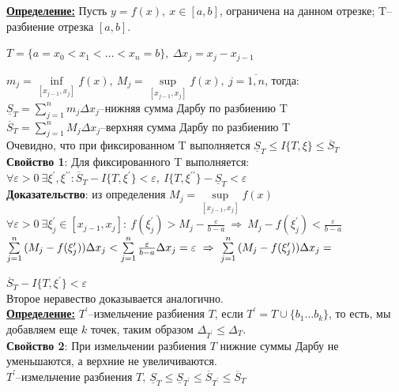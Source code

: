 \documentclass[a4paper,12pt]{article} %
\renewcommand {\leq}{\leqslant}
\begin{document}
\underline{\textbf{Определение:}} Пусть $y = f(x),~x\in [a,b]$, ограничена на данном отрезке; T--разбиение отрезка $[a,b]$.

$ T = \{a = x_0 < x_1 < {\dots} < x_n = b\},~\Delta x_j = x_j - x_{j-1} $

$m_j = \inf\limits_{[x_{j-1},x_j]}f(x),~M_j = \sup\limits_{[x_{j-1},x_j]}f(x),~j = \overline{1,n}$, тогда:\\

$\underline{S}_T = \sum\limits_{j = 1}^{n}{m_j \Delta x_j}$--нижняя сумма Дарбу по разбиению T\\

$\overline{S}_T = \sum\limits_{j = 1}^{n}{M_j \Delta x_j}$--верхняя сумма Дарбу по разбиению T\\

Очевидно, что при фиксированном T выполняется $\underline{S}_T \leq  I\{T,\xi\} \leq \overline{S}_T$\\

\textbf{Свойство 1}: Для фиксированного T выполняется:\\
$\forall\varepsilon>0~\exists \xi^{\prime}, \xi^{\prime \prime}: \overline{S}_T - I\{T,\xi^{\prime}\}<\varepsilon,~I\{T,\xi^{\prime\prime}\}-\underline{S}_T<\varepsilon$\\

\textbf{Доказательство}: из определения $M_j = \sup\limits_{[x_{j-1},x_j]}f(x)$\\
$\forall\varepsilon>0~\exists \xi^{\prime}_j \in [x_{j-1},x_j]:~f(\xi^{\prime}_j)>M_j-\frac{\varepsilon}{b-a}~\Rightarrow~M_j-f(\xi^{\prime}_j)<\frac{\varepsilon}{b-a}$\\

$\sum\limits_{j = 1}^{n} {(M_j-f(\xi^{\prime}_j))\Delta x_j}<\sum\limits_{j = 1}^{n} {\frac{\varepsilon}{b-a}\Delta x_j} = \varepsilon~\Rightarrow~\sum\limits_{j = 1}^{n} {(M_j-f(\xi^{\prime}_j))\Delta x_j}=\\$

$\overline{S}_T - I\{T,\xi^{\prime}\}<\varepsilon$ \\
Второе неравество доказывается аналогично.\\

\underline{\textbf{Определение:}} $T^{\prime}$--измельчение разбиения $T$, если $T^{\prime}=T\cup \{b_1{\dots}b_k\}$, то есть, мы добавляем еще $k$ точек, таким образом $\Delta_{T^{\prime}}\leq \Delta_T$.\\

\textbf{Свойство 2}: При измельчении разбиения $T$ нижние суммы Дарбу не уменьшаются, а верхние не увеличиваются.\\
$T^{\prime}$--измельчение разбиения $T,~\underline{S}_T\leq \underline{S}_{T^{\prime}}\leq \overline{S}_{T^{\prime}}\leq \overline{S}_T$\\
\end{document}
